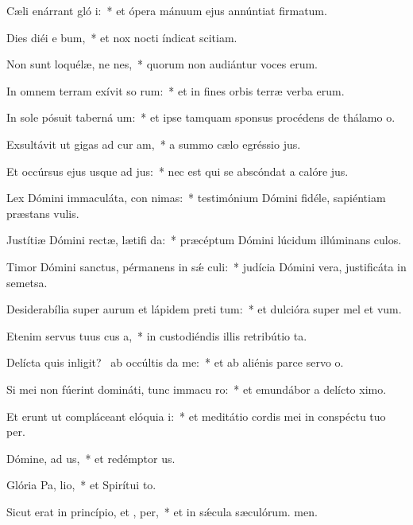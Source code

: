 \item Cæli enárrant gló i:~* et ópera mánuum ejus annúntiat firmatum.
\item Dies diéi e bum,~* et nox nocti índicat scitiam.
\item Non sunt loquélæ, ne nes,~* quorum non audiántur voces erum.
\item In omnem terram exívit so rum:~* et in fines orbis terræ verba erum.
\item In sole pósuit taberná um:~* et ipse tamquam sponsus procédens de thálamo o.
\item Exsultávit ut gigas ad cur am,~* a summo cælo egréssio jus.
\item Et occúrsus ejus usque ad  jus:~* nec est qui se abscóndat a calóre jus.
\item Lex Dómini immaculáta, con nimas:~* testimónium Dómini fidéle, sapiéntiam præstans vulis.
\item Justítiæ Dómini rectæ, lætifi da:~* præcéptum Dómini lúcidum illúminans culos.
\item Timor Dómini sanctus, pérmanens in sǽ culi:~* judícia Dómini vera, justificáta in semetsa.
\item Desiderabília super aurum et lápidem preti tum:~* et dulcióra super mel et vum.
\item Etenim servus tuus cus a,~* in custodiéndis illis retribútio ta.
\item Delícta quis inligit?~\pscross{} ab occúltis  da me:~* et ab aliénis parce servo o.
\item Si mei non fúerint domináti, tunc immacu ro:~* et emundábor a delícto ximo.
\item Et erunt ut compláceant elóquia  i:~* et meditátio cordis mei in conspéctu tuo per.
\item Dómine, ad us,~* et redémptor us.
\item Glória Pa,  lio,~* et Spirítui to.
\item Sicut erat in princípio, et ,  per,~* et in sǽcula sæculórum. men.
